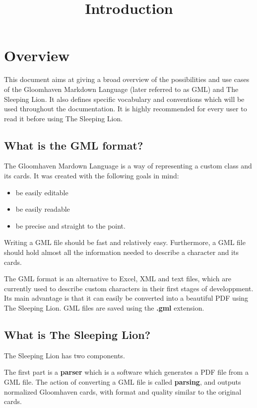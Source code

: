 \documentclass{article}
\title{Introduction}
\date{}
\begin{document}
\maketitle
\tableofcontents

\section{Overview}
This document aims at giving a broad overview of the possibilities and use cases of the Gloomhaven Markdown Language (later referred to as GML) and The Sleeping Lion. It also defines specific vocabulary and conventions which will be used throughout the documentation. It is highly recommended for every user to read it before using The Sleeping Lion.

\subsection{What is the GML format?}
The Gloomhaven Mardown Language is a way of representing a custom class and its cards. It was created with the following goals in mind:
\begin{itemize}
	\item be easily editable
	\item be easily readable
	\item be precise and straight to the point.
\end{itemize}
Writing a GML file should be fast and relatively easy. Furthermore, a GML file should hold almost all the information needed to describe a character and its cards.

The GML format is an alternative to Excel, XML and text files, which are currently used to describe custom characters in their first stages of developpment. Its main advantage is that it can easily be converted into a beautiful PDF using The Sleeping Lion. GML files are saved using the \textbf{.gml} extension.

\subsection{What is The Sleeping Lion?}

The Sleeping Lion has two components.

The first part is a \textbf{parser} which is a software which generates a PDF file from a GML file. The action of converting a GML file is called \textbf{parsing}, and outputs normalized Gloomhaven cards, with format and quality similar to the original cards.
\end{document}
